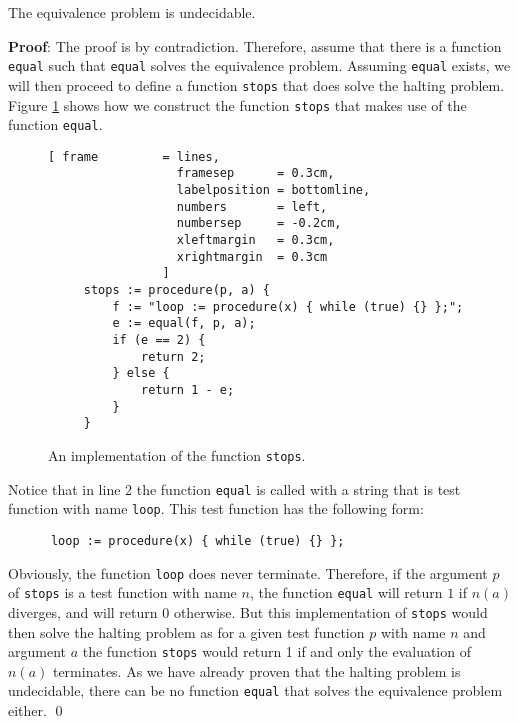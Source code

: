 \begin{Theorem}
\hspace*{\fill} \linebreak
The equivalence problem is undecidable.  
\end{Theorem}

\noindent
\textbf{Proof}:
The proof is by contradiction.  Therefore, assume that there is a function \texttt{equal}
such that \texttt{equal} solves the equivalence problem.  Assuming \texttt{equal} exists, we will
then proceed to define a function \texttt{stops} that does solve the halting problem.
Figure \ref{fig:stops} shows how we construct the function \texttt{stops} that makes use 
of the function \texttt{equal}.



\begin{figure}[!h]
  \centering
\begin{Verbatim}[ frame         = lines, 
                  framesep      = 0.3cm, 
                  labelposition = bottomline,
                  numbers       = left,
                  numbersep     = -0.2cm,
                  xleftmargin   = 0.3cm,
                  xrightmargin  = 0.3cm
                ]
     stops := procedure(p, a) {
         f := "loop := procedure(x) { while (true) {} };";                 
         e := equal(f, p, a);
         if (e == 2) {
             return 2;
         } else {
             return 1 - e;
         }
     }
\end{Verbatim}
  \vspace*{-0.3cm}
  \caption{An implementation of the function \texttt{stops}.}
  \label{fig:stops}
\end{figure}

Notice that in line 2 the function \texttt{equal} is called with a string that is test function with
name \texttt{loop}.  This test function has the following form:
\begin{verbatim}
      loop := procedure(x) { while (true) {} };
\end{verbatim}
Obviously, the function \texttt{loop} does never terminate.
Therefore, if the argument $p$ of \texttt{stops} is a test function with name $n$, 
the function \texttt{equal} will return $1$ if $n(a)$ diverges, and will return $0$ otherwise.
But this implementation of \texttt{stops} would then solve the halting problem as
for a given test function $p$ with name $n$ and argument $a$ the function \texttt{stops} would
return 1 if and only the evaluation of $n(a)$ terminates.  As we have already proven that the
halting problem is undecidable, there can be no function \texttt{equal} that solves the equivalence
problem either.
\qed


